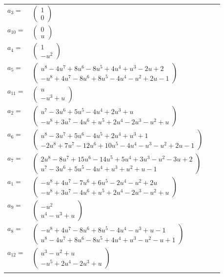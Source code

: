 \documentclass[1p]{elsarticle_modified}
\theoremstyle{definition}
\begin{document}
\begin{tabular}{m{7pt} m{180pt} m{7pt} m{180pt} }
\flushright $a_{3}=$&$\begin{pmatrix}1\\0\end{pmatrix}$ \\
\flushright $a_{10}=$&$\begin{pmatrix}0\\u\end{pmatrix}$ \\
\flushright $a_{4}=$&$\begin{pmatrix}1\\- u^2\end{pmatrix}$ \\
\flushright $a_{5}=$&$\begin{pmatrix}u^8-4 u^7+8 u^6-8 u^5+4 u^4+u^3-2 u+2\\- u^8+4 u^7-8 u^6+8 u^5-4 u^4- u^2+2 u-1\end{pmatrix}$ \\
\flushright $a_{11}=$&$\begin{pmatrix}u\\- u^3+u\end{pmatrix}$ \\
\flushright $a_{2}=$&$\begin{pmatrix}u^7-3 u^6+5 u^5-4 u^4+2 u^3+u\\- u^8+3 u^7-4 u^6+u^5+2 u^4-2 u^3- u^2+u\end{pmatrix}$ \\
\flushright $a_{6}=$&$\begin{pmatrix}u^8-3 u^7+5 u^6-4 u^5+2 u^4+u^3+1\\-2 u^8+7 u^7-12 u^6+10 u^5-4 u^4- u^3- u^2+2 u-1\end{pmatrix}$ \\
\flushright $a_{7}=$&$\begin{pmatrix}2 u^8-8 u^7+15 u^6-14 u^5+5 u^4+3 u^3- u^2-3 u+2\\u^7-3 u^6+5 u^5-4 u^4+u^3+u^2+u-1\end{pmatrix}$ \\
\flushright $a_{1}=$&$\begin{pmatrix}- u^8+4 u^7-7 u^6+6 u^5-2 u^4- u^2+2 u\\- u^8+3 u^7-4 u^6+u^5+2 u^4-2 u^3- u^2+u\end{pmatrix}$ \\
\flushright $a_{9}=$&$\begin{pmatrix}- u^2\\u^4- u^3+u\end{pmatrix}$ \\
\flushright $a_{8}=$&$\begin{pmatrix}- u^8+4 u^7-8 u^6+8 u^5-4 u^4- u^3+u-1\\u^8-4 u^7+8 u^6-8 u^5+4 u^4+u^3- u^2- u+1\end{pmatrix}$ \\
\flushright $a_{12}=$&$\begin{pmatrix}u^3- u^2+u\\- u^5+2 u^4-2 u^3+u\end{pmatrix}$\\&\end{tabular}
\end{document}
